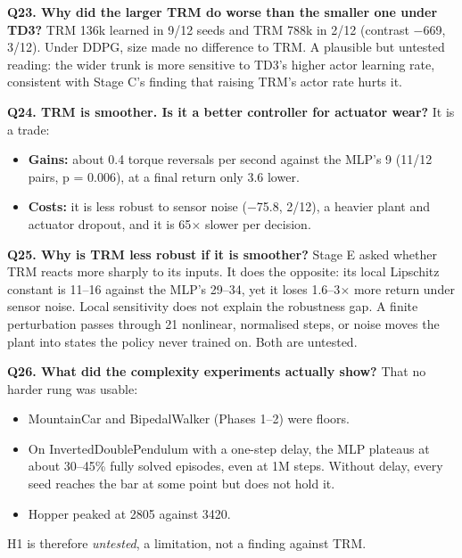 \documentclass[11pt]{article}
\begin{document}
\textbf{Q23. Why did the larger TRM do worse than the smaller one under TD3?} TRM 136k learned in 9/12 seeds and TRM 788k in 2/12 (contrast $-$669, 3/12). Under DDPG, size made no difference to TRM. A plausible but untested reading: the wider trunk is more sensitive to TD3's higher actor learning rate, consistent with Stage C's finding that raising TRM's actor rate hurts it.



\textbf{Q24. TRM is smoother. Is it a better controller for actuator wear?} It is a trade:

\begin{itemize}
\item \textbf{Gains:} about 0.4 torque reversals per second against the MLP's 9 (11/12 pairs, p = 0.006), at a final return only 3.6 lower.
\item \textbf{Costs:} it is less robust to sensor noise ($-$75.8, 2/12), a heavier plant and actuator dropout, and it is 65$\times$ slower per decision.
\end{itemize}



\textbf{Q25. Why is TRM less robust if it is smoother?} Stage E asked whether TRM reacts more sharply to its inputs. It does the opposite: its local Lipschitz constant is 11--16 against the MLP's 29--34, yet it loses 1.6--3$\times$ more return under sensor noise. Local sensitivity does not explain the robustness gap. A finite perturbation passes through 21 nonlinear, normalised steps, or noise moves the plant into states the policy never trained on. Both are untested.



\textbf{Q26. What did the complexity experiments actually show?} That no harder rung was usable:

\begin{itemize}
\item MountainCar and BipedalWalker (Phases 1--2) were floors.
\item On InvertedDoublePendulum with a one-step delay, the MLP plateaus at about 30--45\% fully solved episodes, even at 1M steps. Without delay, every seed reaches the bar at some point but does not hold it.
\item Hopper peaked at 2805 against 3420.
\end{itemize}



H1 is therefore \emph{untested}, a limitation, not a finding against TRM.
\end{document}
